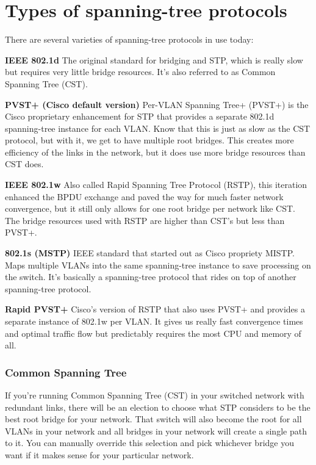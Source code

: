 \documentclass[b5paper,11pt]{memoir}
\begin{document}
\section{Types of spanning-tree protocols}

There are several varieties of spanning-tree protocols in use today:

\textbf{IEEE 802.1d} The original standard for bridging and STP, which
is really slow but requires very little bridge resources. It's also
referred to as Common Spanning Tree (CST).

\textbf{PVST+ (Cisco default version)} Per-VLAN Spanning Tree+ (PVST+)
is the Cisco proprietary enhancement for STP that provides a separate
802.1d spanning-tree instance for each VLAN. Know that this is just as
slow as the CST protocol, but with it, we get to have multiple root
bridges. This creates more efficiency of the links in the network, but
it does use more bridge resources than CST does.

\textbf{IEEE 802.1w} Also called Rapid Spanning Tree Protocol (RSTP),
this iteration enhanced the BPDU exchange and paved the way for much
faster network convergence, but it still only allows for one root bridge
per network like CST. The bridge resources used with RSTP are higher
than CST's but less than PVST+.

\textbf{802.1s (MSTP)} IEEE standard that started out as Cisco propriety
MISTP. Maps multiple VLANs into the same spanning-tree instance to save
processing on the switch. It's basically a spanning-tree protocol that
rides on top of another spanning-tree protocol.

\textbf{Rapid PVST+} Cisco's version of RSTP that also uses PVST+ and
provides a separate instance of 802.1w per VLAN. It gives us really fast
convergence times and optimal traffic flow but predictably requires the
most CPU and memory of all.

\subsubsection[Common Spanning
Tree]{\texorpdfstring{\protect\hypertarget{c15.xhtmlux5cux23c15-sec-13}{}{}Common
Spanning Tree}{Common Spanning Tree}}

If you're running Common Spanning Tree (CST) in your switched network
with redundant links, there will be an election to choose what STP
considers to be the best root bridge for your network. That switch will
also become the root for all VLANs in your network and all bridges in
your network will create a single path to it. You can manually override
this selection and pick whichever bridge you want if it makes sense for
your particular network.
\end{document}
